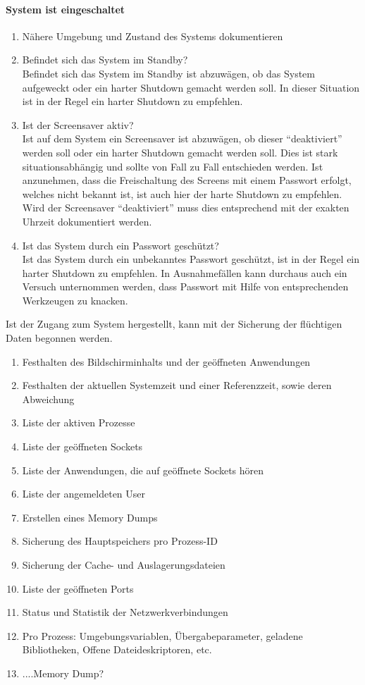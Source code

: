 \paragraph{System ist eingeschaltet}
\begin{enumerate}
\item Nähere Umgebung und Zustand des Systems dokumentieren
\item Befindet sich das System im Standby? \\
Befindet sich das System im Standby ist abzuwägen, ob das System aufgeweckt oder ein harter Shutdown gemacht werden soll. In dieser Situation ist in der Regel ein harter Shutdown  zu empfehlen.
\item Ist der Screensaver aktiv? \\
Ist auf dem System ein Screensaver ist abzuwägen, ob dieser "`deaktiviert"' werden soll oder ein harter Shutdown gemacht werden soll. Dies ist stark situationsabhängig und sollte von Fall zu Fall entschieden werden. Ist anzunehmen, dass die Freischaltung des Screens mit einem Passwort erfolgt, welches nicht bekannt ist, ist auch hier der harte Shutdown zu empfehlen. Wird der Screensaver "`deaktiviert"' muss dies entsprechend mit der exakten Uhrzeit dokumentiert werden.
\item Ist das System durch ein Passwort geschützt? \\
Ist das System durch ein unbekanntes Passwort geschützt, ist in der Regel ein harter Shutdown zu empfehlen. In Ausnahmefällen kann durchaus auch ein Versuch unternommen werden, dass Passwort mit Hilfe von entsprechenden Werkzeugen zu knacken.
\end{enumerate}

Ist der Zugang zum System hergestellt, kann mit der Sicherung der flüchtigen Daten begonnen werden. 

\begin{enumerate}
\item Festhalten des Bildschirminhalts und der geöffneten Anwendungen
\item Festhalten der aktuellen Systemzeit und einer Referenzzeit, sowie deren Abweichung
\item Liste der aktiven Prozesse
\item Liste der geöffneten Sockets
\item Liste der Anwendungen, die auf geöffnete Sockets hören
\item Liste der angemeldeten User
\item Erstellen eines Memory Dumps
\item Sicherung des Hauptspeichers pro Prozess-ID
\item Sicherung der Cache- und Auslagerungsdateien
\item Liste der geöffneten Ports
\item Status und Statistik der Netzwerkverbindungen
\item Pro Prozess: Umgebungsvariablen, Übergabeparameter, geladene Bibliotheken, Offene Dateideskriptoren, etc.
\item ....Memory Dump?
\end{enumerate}


